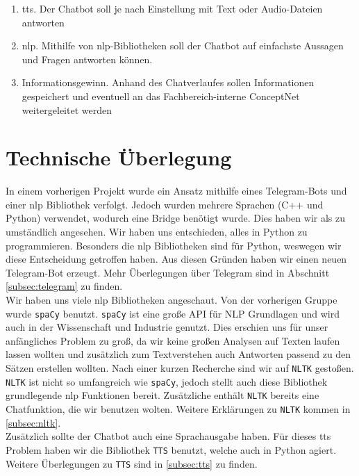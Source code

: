 \documentclass[12pt]{article}
\begin{document}
\begin{enumerate}
    \item \ac{tts}. Der Chatbot soll je nach Einstellung mit Text oder Audio-Dateien antworten
    \item \ac{nlp}. Mithilfe von \ac{nlp}-Bibliotheken soll der Chatbot auf einfachste Aussagen und Fragen antworten können.
    \item Informationsgewinn. Anhand des Chatverlaufes sollen Informationen gespeichert und eventuell an das Fachbereich-interne ConceptNet weitergeleitet werden 
\end{enumerate}

\clearpage

\section{Technische Überlegung}
In einem vorherigen Projekt wurde ein Ansatz mithilfe eines Telegram-Bots und einer \ac{nlp} Bibliothek verfolgt. Jedoch wurden mehrere Sprachen (C++ und Python) verwendet, wodurch eine Bridge benötigt wurde. Dies haben wir als zu umständlich angesehen. Wir haben uns entschieden, alles in Python zu programmieren. Besonders die \ac{nlp} Bibliotheken sind für Python, weswegen wir diese Entscheidung getroffen haben. Aus diesen Gründen haben wir einen neuen Telegram-Bot erzeugt. Mehr Überlegungen über Telegram sind in Abschnitt \ref{subsec:telegram} zu finden. \\
Wir haben uns viele \ac{nlp} Bibliotheken angeschaut. Von der vorherigen Gruppe wurde \texttt{spaCy} benutzt. \texttt{spaCy} ist eine große API für  NLP Grundlagen und wird auch in der Wissenschaft und Industrie genutzt. Dies erschien uns für unser anfängliches Problem zu groß, da wir keine großen Analysen auf Texten laufen lassen wollten und zusätzlich zum Textverstehen auch Antworten passend zu den Sätzen erstellen wollten. Nach einer kurzen Recherche sind wir auf \texttt{NLTK} gestoßen. \texttt{NLTK} ist nicht so umfangreich wie \texttt{spaCy}, jedoch stellt auch diese Bibliothek grundlegende \ac{nlp} Funktionen bereit.  Zusätzliche enthält \texttt{NLTK} bereits eine Chatfunktion, die wir benutzen wolten. Weitere Erklärungen zu \texttt{NLTK} kommen in \ref{subsec:nltk}.\\
Zusätzlich sollte der Chatbot auch eine Sprachausgabe haben. Für dieses \ac{tts} Problem haben wir die Bibliothek \texttt{TTS} benutzt, welche auch in Python agiert. Weitere Überlegungen zu \texttt{TTS} sind in \ref{subsec:tts} zu finden.
\end{document}

